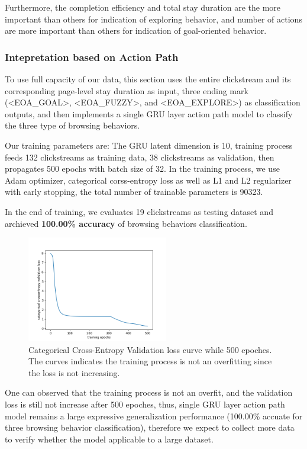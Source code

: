 Furthermore, the completion efficiency and total stay duration are the more important than others for indication of exploring behavior,
and number of actions are more important than others for indication of goal-oriented behavior.

\subsubsection{Intepretation based on Action Path}
\label{sec:inter-action-path}

To use full capacity of our data, this section uses the entire clickstream and its corresponding
page-level stay duration as input, three ending mark (<EOA\_GOAL>, <EOA\_FUZZY>, and <EOA\_EXPLORE>) 
as classification outputs, and then implements a single GRU layer action path model 
to classify the three type of browsing behaviors.

Our training parameters are: 
The GRU latent dimension is 10, training process feeds 132 clickstreams as training data,
38 clickstreams as validation, then 
propagates 500 epochs with batch size of 32. In the training process, we use Adam optimizer,
 categorical corss-entropy loss as well as L1 and L2 regularizer with early stopping,
the total number of trainable parameters is 90323.

In the end of training, we evaluates 19 clickstreams as testing dataset and 
archieved \textbf{100.00\% accuracy} of browsing behaviors classification.

\begin{figure}[H]
    \centering
    \includegraphics[width=0.55\textwidth]{figures/class-loss}
    \caption{Categorical Cross-Entropy Validation loss curve while 500 epoches. 
    The curves indicates the training process is not an overfitting since the loss is not increasing.}
    \label{fig:class-loss}
\end{figure}

One can observed that the training process is not an overfit, and the validation loss is 
still not increase after 500 epoches, thus, single GRU layer action path model 
remains a large expressive generalization performance 
(100.00\% accuate for three browsing behavior classification), therefore
we expect to collect more data to verify whether the model applicable to a large dataset.

